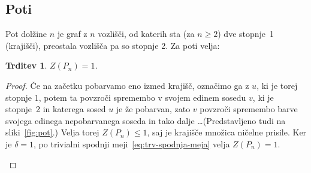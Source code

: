 \documentclass[12pt,a4paper,twoside]{article}
\theoremstyle{definition} %
\theoremstyle{plain} %
\newtheorem{trditev}[definicija]{Trditev}
\numberwithin{equation}{section}  %
\begin{document}
\subsection{Poti}
Pot dolžine $n$ je graf z $n$ vozlišči, od katerih sta (za $n \geq 2$) dve stopnje~1 (krajišči), preostala vozlišča pa so stopnje 2. Za poti velja:
\begin{trditev}
    $Z(P_n) = 1$.
    \label{trd:pot}
\end{trditev}
\begin{proof}
    Če na začetku pobarvamo eno izmed krajišč, označimo ga z $u$, ki je torej stopnje 1, potem ta povzroči spremembo v svojem edinem sosedu $v$, ki je stopnje~2 in katerega sosed $u$ je že pobarvan, zato $v$ povzroči spremembo barve svojega edinega nepobarvanega soseda in tako dalje \ldots (Predstavljeno tudi na sliki~\ref{fig:pot}.) Velja torej $Z(P_n) \leq 1$, saj je krajišče množica ničelne prisile. Ker je $\delta = 1$, po trivialni spodnji meji~\ref{eq:trv-spodnja-meja} velja $Z(P_n) = 1$.
    \begin{figure}[h]
        \begin{subfigure}{0.5\textwidth}
            \centering
        \end{subfigure}
        \begin{subfigure}{0.49\textwidth}
            \centering
\end{subfigure}
\end{figure}
\end{proof}
\end{document}
